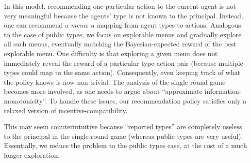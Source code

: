  In this model, recommending one particular action to the current agent is not very meaningful because the agents' type is not known to the principal. Instead, one can recommend a \emph{menu}: a mapping from agent types to actions. Analogous to the case of public types, we focus on explorable menus and gradually explore all such menus, eventually matching the Bayesian-expected reward of the best explorable menu.
%
%
One difficulty is that exploring a given menu does not immediately reveal the reward of a particular type-action pair (because multiple types could map to the same action). Consequently, even keeping track of what the policy knows is now non-trivial. The analysis of the single-round game becomes more involved, as one needs to argue about ``approximate information-monotonicity''. To handle these issues, our recommendation policy satisfies only a relaxed version of incentive-compatibility.

 This may seem counterintuitive because ``reported types'' are completely useless to the principal in the single-round game (whereas public types are very useful). Essentially, we reduce the problem to the public types case, at the cost of a much longer exploration.
